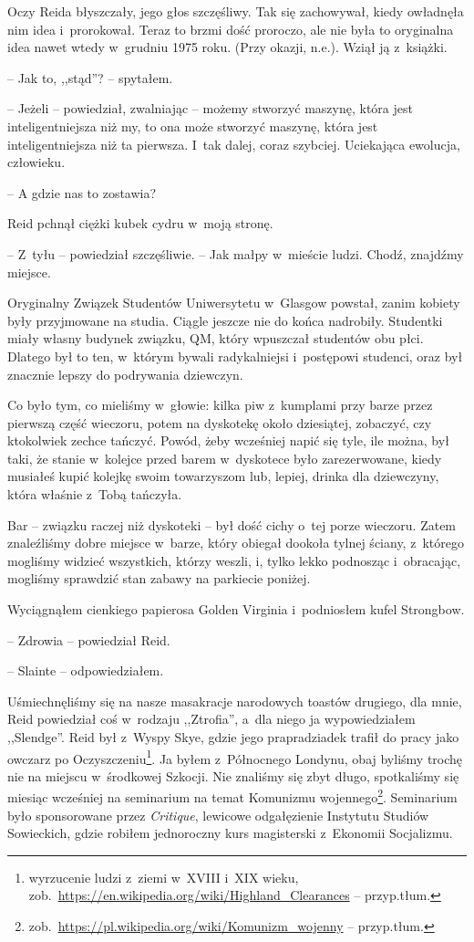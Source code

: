 \documentclass[oneside,polish,11pt,sfheadings]{mwbk}
\begin{document}
Oczy Reida błyszczały, jego głos szczęśliwy. Tak się zachowywał, kiedy
owładnęła nim idea i~prorokował. Teraz to brzmi dość proroczo, ale nie
była to oryginalna idea nawet wtedy w~grudniu 1975 roku. (Przy okazji,
n.e.). Wziął ją z~książki.

-- Jak to, ,,stąd''? -- spytałem.

-- Jeżeli -- powiedział, zwalniając -- możemy stworzyć maszynę, która jest
inteligentniejsza niż my, to ona może stworzyć maszynę, która jest
inteligentniejsza niż ta pierwsza. I~tak dalej, coraz szybciej.
Uciekająca ewolucja, człowieku.

-- A gdzie nas to zostawia?

Reid pchnął ciężki kubek cydru w~moją stronę.

-- Z~tyłu -- powiedział szczęśliwie. -- Jak małpy w~mieście ludzi. Chodź,
znajdźmy miejsce.

Oryginalny Związek Studentów Uniwersytetu w~Glasgow powstał, zanim
kobiety były przyjmowane na studia. Ciągle jeszcze nie do końca
nadrobiły. Studentki miały własny budynek związku, QM, który wpuszczał
studentów obu płci. Dlatego był to ten, w~którym bywali radykalniejsi i~postępowi studenci, oraz był znacznie lepszy do podrywania dziewczyn.

Co było tym, co mieliśmy w~głowie: kilka piw z~kumplami przy barze przez
pierwszą część wieczoru, potem na dyskotekę około dziesiątej, zobaczyć,
czy ktokolwiek zechce tańczyć. Powód, żeby wcześniej napić się tyle, ile
można, był taki, że stanie w~kolejce przed barem w~dyskotece było
zarezerwowane, kiedy musiałeś kupić kolejkę swoim towarzyszom lub,
lepiej, drinka dla dziewczyny, która właśnie z~Tobą tańczyła.

Bar -- związku raczej niż dyskoteki -- był dość cichy o~tej porze
wieczoru. Zatem znaleźliśmy dobre miejsce w~barze, który obiegał dookoła
tylnej ściany, z~którego mogliśmy widzieć wszystkich, którzy weszli, i,
tylko lekko podnosząc i~obracając, mogliśmy sprawdzić stan zabawy na
parkiecie poniżej.

Wyciągnąłem cienkiego papierosa Golden Virginia i~podniosłem kufel
Strongbow.

-- Zdrowia -- powiedział Reid.

-- Slainte -- odpowiedziałem.

Uśmiechnęliśmy się na nasze masakracje narodowych toastów drugiego, dla
mnie, Reid powiedział coś w~rodzaju ,,Ztrofia'', a~dla niego ja
wypowiedziałem ,,Slendge''. Reid był z~Wyspy Skye, gdzie jego
prapradziadek trafił do pracy jako owczarz po Oczyszczeniu\footnote{
wyrzucenie ludzi z~ziemi w~XVIII i~XIX wieku,
zob.~\url{https://en.wikipedia.org/wiki/Highland_Clearances} -- przyp.tłum.}. Ja byłem z~Północnego Londynu, obaj byliśmy trochę nie
na miejscu w~środkowej Szkocji. Nie znaliśmy się zbyt długo, spotkaliśmy
się miesiąc wcześniej na seminarium na temat Komunizmu wojennego\footnote{
zob.~\url{https://pl.wikipedia.org/wiki/Komunizm_wojenny}  -- przyp.tłum. }. Seminarium było sponsorowane przez \emph{Critique},
lewicowe odgałęzienie Instytutu Studiów Sowieckich, gdzie robiłem
jednoroczny kurs magisterski z~Ekonomii Socjalizmu.
\end{document}
